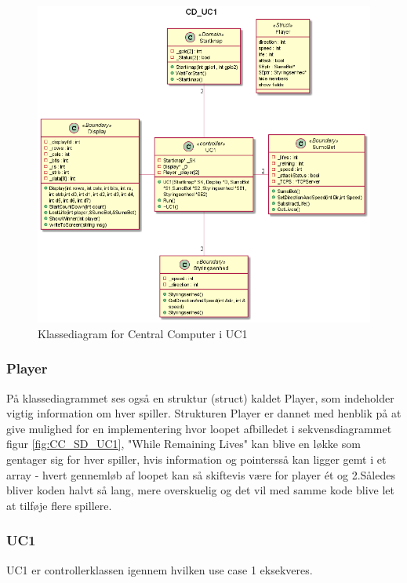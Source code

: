 \begin{figure}
    \centering
    \includegraphics[width=\textwidth]{figs/Design/Central Computer/applikationsmodel/CD_UC1.png}
    \caption{Klassediagram for Central Computer i UC1}
    \label{fig:CC_CD_UC1}
\end{figure}

\subsubsection{Player}
\label{subsubsec:Player}
På klassediagrammet ses også en struktur (struct) kaldet Player, som indeholder vigtig information om hver spiller. Strukturen Player er dannet med henblik på at give mulighed for en implementering hvor loopet afbilledet i sekvensdiagrammet figur \ref{fig:CC_SD_UC1}, "While Remaining Lives" kan blive en løkke som gentager sig for hver spiller, hvis information og pointersså kan ligger gemt i et array - hvert gennemløb af loopet kan så skiftevis være for player ét og 2.Således bliver koden halvt så lang, mere overskuelig og det vil med samme kode blive let at tilføje flere spillere.  


\subsubsection{UC1}
UC1 er controllerklassen \cite{ApplikationsmodellerI2ISE} igennem hvilken use case 1 eksekveres. 
